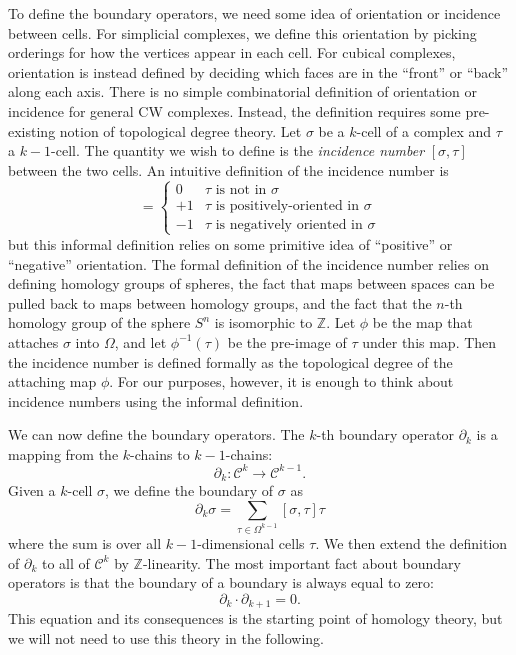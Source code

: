\documentclass[twocolumn]{article}
\begin{document}
To define the boundary operators, we need some idea of orientation or incidence between cells.
For simplicial complexes, we define this orientation by picking orderings for how the vertices appear in each cell.
For cubical complexes, orientation is instead defined by deciding which faces are in the ``front'' or ``back'' along each axis.
There is no simple combinatorial definition of orientation or incidence for general CW complexes.
Instead, the definition requires some pre-existing notion of topological degree theory.
Let $\sigma$ be a $k$-cell of a complex and $\tau$ a $k - 1$-cell.
The quantity we wish to define is the \emph{incidence number} $[\sigma, \tau]$ between the two cells.
An intuitive definition of the incidence number is
\begin{equation}
    [\sigma, \tau] = \begin{cases}0 & \text{$\tau$ is not in $\sigma$} \\ +1 & \text{$\tau$ is positively-oriented in $\sigma$} \\ -1 & \text{$\tau$ is negatively oriented in $\sigma$}\end{cases}
\end{equation}
but this informal definition relies on some primitive idea of ``positive'' or ``negative'' orientation.
The formal definition of the incidence number relies on defining homology groups of spheres, the fact that maps between spaces can be pulled back to maps between homology groups, and the fact that the $n$-th homology group of the sphere $S^n$ is isomorphic to $\mathbb{Z}$.
Let $\phi$ be the map that attaches $\sigma$ into $\Omega$, and let $\phi^{-1}(\tau)$ be the pre-image of $\tau$ under this map.
Then the incidence number is defined formally as the topological degree of the attaching map $\phi$.
For our purposes, however, it is enough to think about incidence numbers using the informal definition.

We can now define the boundary operators.
The $k$-th boundary operator $\partial_k$ is a mapping from the $k$-chains to $k - 1$-chains:
\begin{equation}
    \partial_k : \mathscr{C}^k \to \mathscr{C}^{k - 1}.
\end{equation}
Given a $k$-cell $\sigma$, we define the boundary of $\sigma$ as
\begin{equation}
    \partial_k\sigma = \sum_{\tau \in \Omega^{k - 1}}[\sigma, \tau]\tau
\end{equation}
where the sum is over all $k - 1$-dimensional cells $\tau$.
We then extend the definition of $\partial_k$ to all of $\mathscr C^k$ by $\mathbb{Z}$-linearity.
The most important fact about boundary operators is that the boundary of a boundary is always equal to zero:
\begin{equation}
    \partial_k\cdot\partial_{k + 1} = 0.
    \label{eq:ddzero}
\end{equation}
This equation and its consequences is the starting point of homology theory, but we will not need to use this theory in the following.
\end{document}
